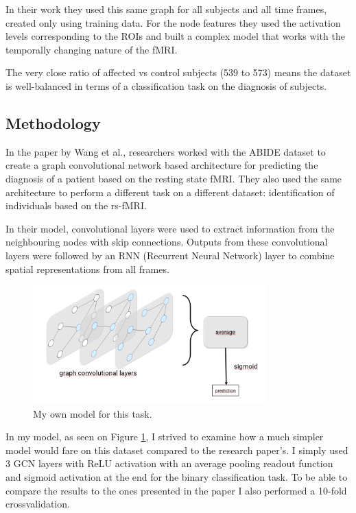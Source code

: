 	In their work they used this same graph for all subjects and all time frames, created only using training data. For the node features they used the activation levels corresponding to the ROIs and built a complex model that works with the temporally changing nature of the fMRI. 
	
	
	The very close ratio of affected vs control subjects (539 to 573) means the dataset is well-balanced in terms of a classification task on the diagnosis of subjects. 
	
	\subsection{Methodology}
	In the paper \cite{wang2021graph} by Wang et al., researchers worked with the ABIDE dataset to create a graph convolutional network based architecture for predicting the diagnosis of a patient based on the resting state fMRI. They also used the same architecture to perform a different task on a different dataset: identification of individuals based on the rs-fMRI.
	
	
	 In their model, convolutional layers were used to extract information from the neighbouring nodes with skip connections. Outputs from these convolutional layers were followed by an RNN (Recurrent Neural Network) layer to combine spatial representations from all frames. 
	
	\begin{figure}[!h]
		\centering
		\includegraphics[width=0.8\textwidth]{figures/onlab_abra.png}
		\caption{My own model for this task.}
		\label{fig:onlab}
	\end{figure}
	
	In my model, as seen on Figure \ref{fig:onlab}, I strived to examine how a much simpler model would fare on this dataset compared to the research paper's. I simply used 3 GCN layers with ReLU activation with an average pooling readout function and sigmoid activation at the end for the binary classification task. To be able to compare the results to the ones presented in the paper I also performed a 10-fold crossvalidation.
	
